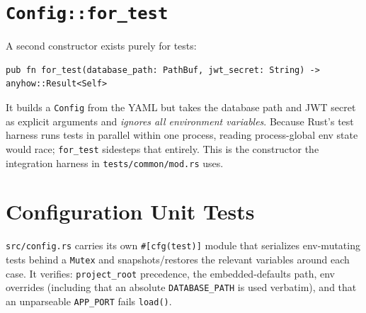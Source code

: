 \section{\texttt{Config::for\_test}}

A second constructor exists purely for tests:

\begin{lstlisting}
pub fn for_test(database_path: PathBuf, jwt_secret: String) -> anyhow::Result<Self>
\end{lstlisting}

It builds a \verb|Config| from the YAML but takes the database path and JWT
secret as explicit arguments and \emph{ignores all environment variables}.
Because Rust's test harness runs tests in parallel within one process, reading
process-global env state would race; \verb|for_test| sidesteps that entirely.
This is the constructor the integration harness in \verb|tests/common/mod.rs|
uses.

\section{Configuration Unit Tests}

\verb|src/config.rs| carries its own \verb|#[cfg(test)]| module that serializes
env-mutating tests behind a \verb|Mutex| and snapshots/restores the relevant
variables around each case. It verifies: \verb|project_root| precedence, the
embedded-defaults path, env overrides (including that an absolute
\verb|DATABASE_PATH| is used verbatim), and that an unparseable \verb|APP_PORT|
fails \verb|load()|.
